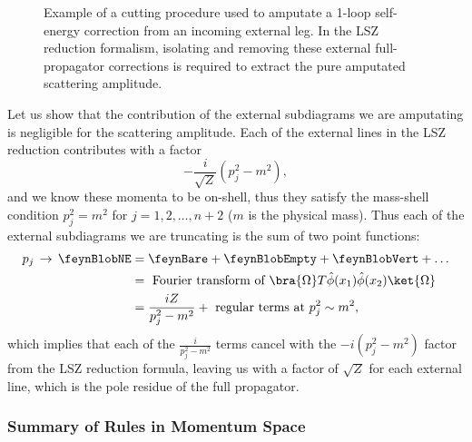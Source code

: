 \begin{example}
\begin{figure}[H]
\begin{minipage}{0.5\textwidth}
        \end{minipage}
        \hfill
        \begin{minipage}{0.45\textwidth}
            \caption{Example of a cutting procedure used to amputate a 1-loop self-energy correction from an incoming external leg. In the LSZ reduction formalism, isolating and removing these external full-propagator corrections is required to extract the pure amputated scattering amplitude.}
            \label{fig:amputation_cut}
        \end{minipage}%
    \end{figure}
\end{example}

Let us show that the contribution of the external subdiagrams we are amputating is negligible for the scattering amplitude. Each of the external lines in the LSZ reduction contributes with a factor
\[
    -\frac{i}{\sqrt{Z}}\left( p_j^2 - m^2 \right),
\]
and we know these momenta to be on-shell, thus they satisfy the mass-shell condition \(p_j^2 = m^2\) for \(j=1,2,\ldots,n+2\) (\(m\) is the physical mass). Thus each of the external subdiagrams we are truncating is the sum of two point functions:
\[
    \begin{aligned}
        p_j \, \to \, \feynBlobNE & = \feynBare + \feynBlobEmpty + \feynBlobVert + \dots                                        \\
                                  & = \text{ Fourier transform of } \bra{\Omega} T \hat{\phi}(x_1) \hat{\phi}(x_2) \ket{\Omega} \\
                                  & = \frac{i Z}{p_j^2 - m^2} + \text{ regular terms at } p_j^2 \sim m^2,
    \end{aligned}
\]
which implies that each of the \(\tfrac{i}{p_j^2 - m^2}\) terms cancel with the \(-i(p_j^2 - m^2)\) factor from the LSZ reduction formula, leaving us with a factor of \(\sqrt{Z}\) for each external line, which is the pole residue of the full propagator.

\subsubsection{Summary of Rules in Momentum Space}

